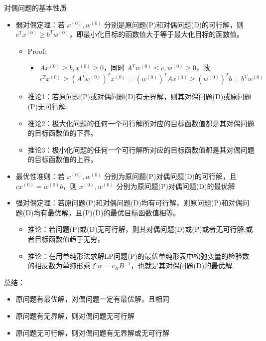 \begin{remark}
    对偶问题的基本性质
    \begin{itemize}
        \item 弱对偶定理：若 $x^{(0)}, w^{(0)}$ 分别是原问题(P)和对偶问题(D)的可行解，则 $c^Tx^{(0)} \ge b^Tw^{(0)}$，即最小化目标的函数值大于等于最大化目标的函数值。\begin{itemize}
            \item Proof:\begin{itemize}
                \item $Ax^{(0)} \ge b, x^{(0)} \ge 0$，同时 $A^Tw^{(0)} \le c, w^{(0)} \ge 0$，故 $c^Tx^{(0)} \ge (A^Tw^{(0)})^Tx^{(0)} = (w^{(0)})^TAx^{(0)} \ge (w^{(0)})^Tb = b^Tw^{(0)}$
            \end{itemize}
            \item 推论1：若原问题(P)或对偶问题(D)有无界解，则其对偶问题(D)或原问题(P)无可行解
            \item 推论2：极大化问题的任何一个可行解所对应的目标函数值都是其对偶问题的目标函数值的下界。
            \item 推论3：极小化问题的任何一个可行解所对应的目标函数值都是其对偶问题的目标函数值的上界。
        \end{itemize}
        \item 最优性准则：若 $x^{(0)}, w^{(0)}$ 分别为原问题(P)对偶问题(D)的可行解，且 $cx^{(0)} = w^{(0)}b$，则 $x^{(0)}, w^{(0)}$ 分别为原问题(P)对偶问题(D)的最优解
        \item 强对偶定理：若原问题(P)和对偶问题(D)均有可行解，则原问题(P)和对偶问题(D)均有最优解，且(P)(D)的最优目标函数值相等。\begin{itemize}
            \item 推论：若问题(P)或(D)无可行解，则其对偶问题(D)或(P)或者无可行解,或者目标函数值趋于无穷。
            \item 推论：在用单纯形法求解LP问题(P)的最优单纯形表中松弛变量的检验数的相反数为单纯形乘子$w = c_BB^{-1}$，也就是其对偶问题(D)的最优解.
        \end{itemize}
    \end{itemize}
\end{remark}

\begin{remark}
    总结：
    \begin{itemize}
        \item 原问题有最优解，对偶问题一定有最优解，且相同
        \item 原问题有无界解，则对偶问题无可行解
        \item 原问题无可行解，则对偶问题有无界解或无可行解
    \end{itemize}
\end{remark}

